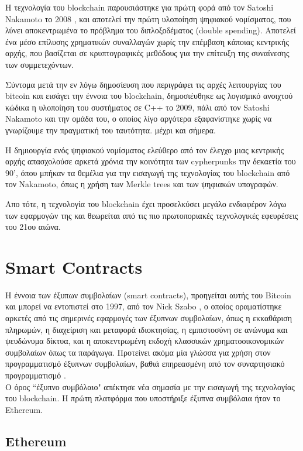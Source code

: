 
Η τεχνολογία του blockchain παρουσιάστηκε για πρώτη φορά από τον Satoshi Nakamoto το 2008 
\cite{bitcoin}, και αποτελεί την πρώτη υλοποίηση ψηφιακού νομίσματος, που λύνει αποκεντρωμένα το πρόβλημα του διπλοξοδέματος (double spending). Αποτελεί ένα μέσο επίλυσης χρηματικών συναλλαγών χωρίς την επέμβαση κάποιας κεντρικής αρχής, που βασίζεται σε κρυπτογραφικές μεθόδους για την επίτευξη της συναίνεσης των συμμετεχόντων.

Σύντομα μετά την εν λόγω δημοσίευση που περιγράφει τις αρχές λειτουργίας του bitcoin και εισάγει
την έννοια του blockchain, δημοσιέυθηκε ως λογισμικό ανοιχτού κώδικα η υλοποίηση του συστήματος
σε C++ το 2009, πάλι από τον Satoshi Nakamoto και την ομάδα του, ο οποίος λίγο αργότερα εξαφανίστηκε
χωρίς να  γνωρίζουμε την πραγματική του ταυτότητα. μέχρι και σήμερα. 


Η δημιουργία ενός ψηφιακού νομίσματος ελεύθερο από τον έλεγχο μιας κεντρικής αρχής απασχολούσε αρκετά χρόνια την κοινότητα των cypherpunks την δεκαετία του 90', όπου μπήκαν τα θεμέλια για την
εισαγωγή της τεχνολογίας του blockchain από τον Nakamoto, όπως η χρήση των Merkle trees και των ψηφιακών υπογραφών.

Απο τότε, η τεχνολογία του blockchain έχει προσελκύσει μεγάλο ενδιαφέρον λόγω των εφαρμογών της και
θεωρείται από τις πιο πρωτοποριακές τεχνολογικές εφευρέσεις του 21ου αιώνα. 




\section{ Smart Contracts}

Η έννοια των έξυπων συμβολαίων (smart contracts), προηγείται αυτής του Bitcoin και μπορεί να εντοπιστεί 
στο 1997, από τον Nick Szabo \cite{szabo1}, ο οποίος οραματίστηκε αρκετές από τις σημερινές εφαρμογές
των έξυπνων συμβολαίων, όπως η εκκαθάριση πληρωμών, η διαχείριση και μεταφορά ιδιοκτησίας,  η 
εμπιστοσύνη σε ανώνυμα και ψευδώνυμα δίκτυα, και η αποκεντρωμένη εκδοχή κλασσικών χρηματοοικονομικών συμβολαίων όπως τα παράγωγα. Προτείνει ακόμα μία γλώσσα για χρήση στον 
προγραμματισμό έξυπνων συμβολαίων, βαθιά επηρεασμένη από τον συναρτησιακό προγραμματισμό
\cite{szabosmartcontract}.
\\
Ο όρος ``έξυπνο συμβόλαιο" απέκτησε νέα σημασία με την εισαγωγή της τεχνολογίας του blockchain. Η πρώτη
πλατφόρμα που υποστήριξε έξυπνα συμβόλαια ήταν το Ethereum.


\subsection{Ethereum}

